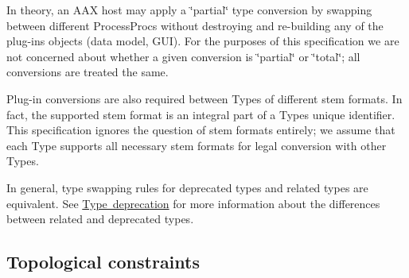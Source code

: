 In theory, an A\+AX host may apply a \char`\"{}partial\char`\"{} type conversion by swapping between different Process\+Procs without destroying and re-\/building any of the plug-\/in\textquotesingle{}s objects (data model, G\+UI). For the purposes of this specification we are not concerned about whether a given conversion is \char`\"{}partial\char`\"{} or \char`\"{}total\char`\"{}; all conversions are treated the same.

Plug-\/in conversions are also required between Types of different stem formats. In fact, the supported stem format is an integral part of a Type\textquotesingle{}s unique identifier. This specification ignores the question of stem formats entirely; we assume that each Type supports all necessary stem formats for legal conversion with other Types.

In general, type swapping rules for deprecated types and related types are equivalent. See \mbox{\hyperlink{a00826_advancedTopics_relatedTypes_deprecation}{Type deprecation}} for more information about the differences between related and deprecated types.\hypertarget{a00826_advancedTopics_relatedTypes_constraints}{}\subsection{Topological constraints}\label{a00826_advancedTopics_relatedTypes_constraints}

